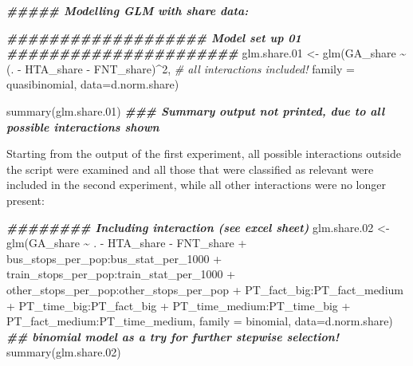 \documentclass[
]{article}
\newenvironment{Shaded}{\begin{snugshade}}{\end{snugshade}}
\newcommand{\AttributeTok}[1]{\textcolor[rgb]{0.77,0.63,0.00}{#1}}
\newcommand{\CommentTok}[1]{\textcolor[rgb]{0.56,0.35,0.01}{\textit{#1}}}
\newcommand{\DecValTok}[1]{\textcolor[rgb]{0.00,0.00,0.81}{#1}}
\newcommand{\DocumentationTok}[1]{\textcolor[rgb]{0.56,0.35,0.01}{\textbf{\textit{#1}}}}
\newcommand{\FloatTok}[1]{\textcolor[rgb]{0.00,0.00,0.81}{#1}}
\newcommand{\FunctionTok}[1]{\textcolor[rgb]{0.00,0.00,0.00}{#1}}
\newcommand{\NormalTok}[1]{#1}
\newcommand{\OtherTok}[1]{\textcolor[rgb]{0.56,0.35,0.01}{#1}}
\newcommand{\SpecialCharTok}[1]{\textcolor[rgb]{0.00,0.00,0.00}{#1}}
\begin{document}
\begin{Shaded}
\begin{Highlighting}[]
\DocumentationTok{\#\#\#\#\#  Modelling GLM with share data:}

\DocumentationTok{\#\#\#\#\#\#\#\#\#\#\#\#\#\#\#\#\#\#\# Model set up 01 \#\#\#\#\#\#\#\#\#\#\#\#\#\#\#\#\#\#\#\#\#\#}
\NormalTok{glm.share}\FloatTok{.01} \OtherTok{\textless{}{-}} \FunctionTok{glm}\NormalTok{(GA\_share }\SpecialCharTok{\textasciitilde{}}\NormalTok{ (. }\SpecialCharTok{{-}}\NormalTok{ HTA\_share }\SpecialCharTok{{-}}\NormalTok{ FNT\_share)}\SpecialCharTok{\^{}}\DecValTok{2}\NormalTok{, }\CommentTok{\# all interactions included!}
                \AttributeTok{family =}\NormalTok{ quasibinomial, }\AttributeTok{data=}\NormalTok{d.norm.share)}

\FunctionTok{summary}\NormalTok{(glm.share}\FloatTok{.01}\NormalTok{) }
\DocumentationTok{\#\#\# Summary output not printed, due to all possible interactions shown}
\end{Highlighting}
\end{Shaded}

Starting from the output of the first experiment, all possible
interactions outside the script were examined and all those that were
classified as relevant were included in the second experiment, while all
other interactions were no longer present:

\begin{Shaded}
\begin{Highlighting}[]
\DocumentationTok{\#\#\#\#\#\#\#\# Including interaction (see excel sheet)}
\NormalTok{glm.share}\FloatTok{.02} \OtherTok{\textless{}{-}} \FunctionTok{glm}\NormalTok{(GA\_share }\SpecialCharTok{\textasciitilde{}}\NormalTok{ . }\SpecialCharTok{{-}}\NormalTok{ HTA\_share }\SpecialCharTok{{-}}\NormalTok{ FNT\_share}
                    \SpecialCharTok{+}\NormalTok{ bus\_stops\_per\_pop}\SpecialCharTok{:}\NormalTok{bus\_stat\_per\_1000}
                    \SpecialCharTok{+}\NormalTok{ train\_stops\_per\_pop}\SpecialCharTok{:}\NormalTok{train\_stat\_per\_1000}
                    \SpecialCharTok{+}\NormalTok{ other\_stops\_per\_pop}\SpecialCharTok{:}\NormalTok{other\_stops\_per\_pop}
                    \SpecialCharTok{+}\NormalTok{ PT\_fact\_big}\SpecialCharTok{:}\NormalTok{PT\_fact\_medium}
                    \SpecialCharTok{+}\NormalTok{ PT\_time\_big}\SpecialCharTok{:}\NormalTok{PT\_fact\_big}
                    \SpecialCharTok{+}\NormalTok{ PT\_time\_medium}\SpecialCharTok{:}\NormalTok{PT\_time\_big}
                    \SpecialCharTok{+}\NormalTok{ PT\_fact\_medium}\SpecialCharTok{:}\NormalTok{PT\_time\_medium, }
                \AttributeTok{family =}\NormalTok{ binomial, }\AttributeTok{data=}\NormalTok{d.norm.share) }
    \DocumentationTok{\#\# binomial model as a try for further stepwise selection!}
\FunctionTok{summary}\NormalTok{(glm.share}\FloatTok{.02}\NormalTok{)}
\end{Highlighting}
\end{Shaded}
\end{document}
